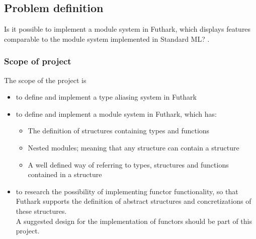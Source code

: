 \subsection{Problem definition}
\label{subsec:probdef}
Is it possible to implement a module system in Futhark, which displays features
comparable to the module system implemented in Standard ML? \cite{crash_course}.

\subsubsection{Scope of project}
\label{subsec:project_scope}
The scope of the project is
\begin{itemize}
  \item to define and implement a type aliasing system in Futhark
  \item to define and implement a module system in Futhark, which has:
    \begin{itemize}
      \item The definition of structures containing types and functions
      \item Nested modules; meaning that any structure can contain a structure
      \item A well defined way of referring to types, structures and functions
        contained in a structure
    \end{itemize}
  \item to research the possibility of implementing functor functionality, so that Futhark supports the
    definition of abstract structures and concretizations of these structures.
    \\    A suggested design for the implementation of functors should be part of this project.
\end{itemize}
\clearpage

